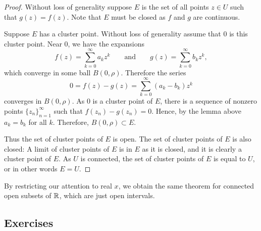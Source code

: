 \begin{proof}
Without loss of generality suppose $E$ is the set of all points $z \in U$ such that
$g(z)=f(z)$.  Note that $E$ must be closed as $f$ and $g$ are continuous.

Suppose $E$ has a cluster point.  Without loss of generality assume that $0$
is this cluster point.  Near $0$,
we have the expansions
\begin{equation*}
f(z) = \sum_{k=0}^\infty a_k {z}^k 
\qquad
\text{and}
\qquad
g(z) = \sum_{k=0}^\infty b_k {z}^k ,
\end{equation*}
which converge in some ball $B(0,\rho)$.  Therefore the series
\begin{equation*}
0 = f(z)-g(z) = 
\sum_{k=0}^\infty (a_k-b_k) z^k
\end{equation*}
converges in $B(0,\rho)$.  As $0$ is a cluster point of $E$, there
is a sequence of nonzero points $\{ z_n \}_{n=1}^\infty$ such that
$f(z_n) -g(z_n) = 0$.  Hence, by the lemma above 
$a_k = b_k$ for all $k$.  Therefore, $B(0,\rho) \subset E$.

Thus the set of cluster points of $E$ is open.  The set of cluster points
of $E$ is also closed: A limit of cluster points of $E$ is in $E$
as it is closed, and it is clearly a cluster point of $E$.
As $U$ is connected, the set of cluster points of $E$
is equal to $U$, or in other words $E = U$.
\end{proof}

By restricting our attention to real $x$, we obtain the same
theorem for connected open subsets of ${\mathbb{R}}$, which are just open intervals.

\subsection{Exercises}


